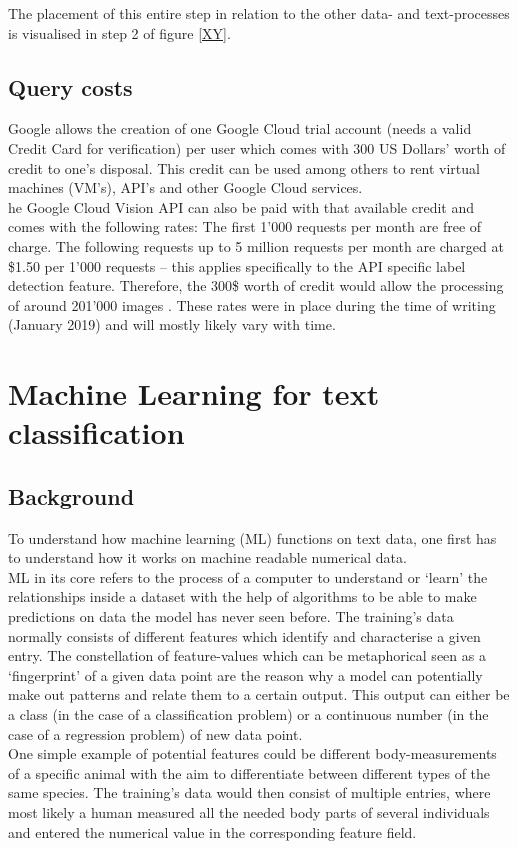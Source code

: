 The placement of this entire step in relation to the other data- and text-processes is visualised in step 2 of figure \ref{XY}.

\subsection{Query costs} \label{vision_query_cost}
Google allows the creation of one Google Cloud trial account (needs a valid Credit Card for verification) per user which comes with 300 US Dollars’ worth of credit to one’s disposal. This credit can be used among others to rent virtual machines (VM’s), API’s and other Google Cloud services.\\
\newline
he Google Cloud Vision API can also be paid with that available credit and comes with the following rates: The first 1’000 requests per month are free of charge. The following requests up to 5 million requests per month are charged at \$1.50 per 1’000 requests – this applies specifically to the API specific label detection feature. Therefore, the 300\$ worth of credit would allow the processing of around 201’000 images \parencite{2019GooglePricing}. These rates were in place during the time of writing (January 2019) and will mostly likely vary with time.

\section{Machine Learning for text classification} 
\subsection{Background}
To understand how machine learning (ML) functions on text data, one first has to understand how it works on machine readable numerical data.\\
ML in its core refers to the process of a computer to understand or ‘learn’ the relationships inside a dataset with the help of algorithms to be able to make predictions on data the model has never seen before. The training's data normally consists of different features which identify and characterise a given entry. The constellation of feature-values which can be metaphorical seen as a ‘fingerprint’ of a given data point are the reason why a model can potentially make out patterns and relate them to a certain output. This output can either be a class (in the case of a classification problem) or a continuous number (in the case of a regression problem) of new data point.\\
\newline
One simple example of potential features could be different body-measurements of a specific animal with the aim to differentiate between different types of the same species. The training's data would then consist of multiple entries, where most likely a human measured all the needed body parts of several individuals and entered the numerical value in the corresponding feature field.\\

